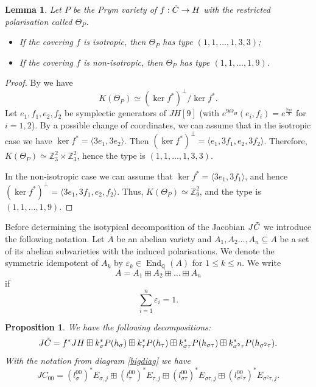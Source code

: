 \documentclass{amsart}
\newtheorem{lem}[thm]{Lemma}
\newtheorem{prop}[thm]{Proposition}
\theoremstyle{remark}
\numberwithin{equation}{section}
\newcommand{\tC}{\Tilde{C}}
\DeclareMathOperator{\End}{End}
\begin{document}
\begin{lem}
Let $P$ be the Prym variety of $f:\tC\to H$ with the restricted polarisation called $\Theta_P$.
\label{polariz}
\begin{itemize}
    \item[i)] If the covering $f$ is isotropic, then $\Theta_P$ has type $(1,1,\ldots, 1, 3,3)$;
    \item[ii)] If the covering $f$ is non-isotropic, then $\Theta_P$ has type $(1,1,\ldots, 1, 9)$.
\end{itemize}
    
\end{lem}

\begin{proof}
    By \cite[Proposition 3.2.9]{LangeRodr} we have $$K(\Theta_P) \simeq (\ker f^*)^{\bot}/ \ker f^*.$$
    Let $e_1, f_1, e_2, f_2$ be  symplectic generators of $JH[9]$ (with $e^{9\Theta_H}(e_i, f_i) = e^{\frac{2\pi i }{9}}$ for $i = 1,2$). By a possible change of coordinates, we can assume that in the isotropic case we have $\ker f^* = \langle 3e_1, 3e_2 \rangle$. Then $(\ker f^*)^{\bot} = \langle e_1, 3f_1, e_2, 3f_2 \rangle$. Therefore, $K(\Theta_P) \simeq\mathbb{Z}_3^2 \times \mathbb{Z}_3^2 $, hence the type is $(1,1,\ldots, 1,3,3)$. 
    
    In the non-isotropic case we can assume that $\ker f^* = \langle 3e_1, 3f_1 \rangle$, and hence $(\ker f^*)^{\bot} = \langle 3e_1, 3f_1, e_2, f_2\rangle$. Thus, $K(\Theta_P) \simeq \mathbb{Z}_{9}^2$, and the type is $(1,1,\ldots, 1,9)$.
\end{proof}

Before determining the isotypical decomposition of the Jacobian $J\tC$ we introduce the following notation. Let $A$ be an abelian variety and $A_1, A_2 \ldots, A_n \subseteq A$ be a set of its abelian subvarieties with the induced polarisations. We denote the symmetric idempotent of $A_k$ by $\varepsilon_{k} \in \End_{\mathbb{Q}}(A)$ for $1 \leq k \leq n$. We write $$A = A_1 \boxplus A_2 \boxplus \ldots \boxplus A_n$$ if $$\sum_{i=1}^n \varepsilon_i = 1.$$ 

\begin{prop}
\label{rozklad}
    We have the following decompositions:
    $$J\tC = f^*JH \boxplus k_{\sigma}^*P(h_{\sigma}) \boxplus k_{\tau}^*P(h_{\tau}) \boxplus k_{\sigma\tau}^*P(h_{\sigma\tau}) \boxplus k_{\sigma^2\tau}^*P(h_{\sigma^2\tau}).$$
    With the notation from diagram \ref{bigdiag} we have
    $$JC_{00} = (l_{\sigma}^{00})^*E_{\sigma, j} \boxplus (l_{\tau}^{00})^*E_{\tau, j} \boxplus (l_{\sigma\tau}^{00})^*E_{\sigma\tau, j} \boxplus (l_{\sigma^2\tau}^{00})^*E_{\sigma^2\tau, j}.$$
\end{prop}
\end{document}
